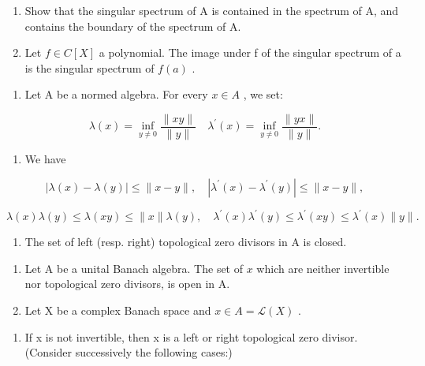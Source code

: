 \begin{enumerate}
\def\labelenumi{\alph{enumi})}
\item
  Show that the singular spectrum of A is contained in the spectrum of A, and contains the boundary of the spectrum of A.
\item
  Let \(f \in C[X]\) a polynomial. The image under f of the singular spectrum of a is the singular spectrum of \(f(a)\) .
\end{enumerate}

\begin{enumerate}
\def\labelenumi{\arabic{enumi})}
\setcounter{enumi}{16}
\tightlist
\item
  Let A be a normed algebra. For every \(x \in A\) , we set:
\end{enumerate}

\[
\lambda (x) = \inf _ {y \neq 0} \frac {\| x y \|}{\| y \|} \quad \lambda^ {\prime} (x) = \inf _ {y \neq 0} \frac {\| y x \|}{\| y \|}.
\]

\begin{enumerate}
\def\labelenumi{\alph{enumi})}
\tightlist
\item
  We have
\end{enumerate}

\[
| \lambda (x) - \lambda (y) | \leqslant \| x - y \|, \quad | \lambda^ {\prime} (x) - \lambda^ {\prime} (y) | \leqslant \| x - y \|,
\]

\[
\lambda (x) \lambda (y) \leqslant \lambda (x y) \leqslant \| x \| \lambda (y), \quad \lambda^ {\prime} (x) \lambda^ {\prime} (y) \leqslant \lambda^ {\prime} (x y) \leqslant \lambda^ {\prime} (x) \| y \|.
\]

\begin{enumerate}
\def\labelenumi{\alph{enumi})}
\setcounter{enumi}{1}
\tightlist
\item
  The set of left (resp. right) topological zero divisors in A is closed.
\end{enumerate}

\begin{enumerate}
\def\labelenumi{\arabic{enumi})}
\setcounter{enumi}{17}
\item
  Let A be a unital Banach algebra. The set of \(x\) which are neither invertible nor topological zero divisors, is open in A.
\item
  Let X be a complex Banach space and \(x \in A = \mathcal{L}(X)\) .
\end{enumerate}

\begin{enumerate}
\def\labelenumi{\alph{enumi})}
\tightlist
\item
  If x is not invertible, then x is a left or right topological zero divisor. (Consider successively the following cases:)
\end{enumerate}

